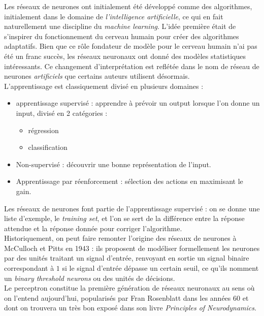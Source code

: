 \documentclass{article}
\theoremstyle{definition}
\begin{document}
Les réseaux de neurones ont initialement été développé comme des algorithmes, initialement dans le domaine de \textit{l'intelligence artificielle}, ce qui en fait naturellement une discipline du \textit{machine learning}. L'idée première était de s'inspirer du fonctionnement du cerveau humain pour créer des algorithmes adaptatifs. Bien que ce rôle fondateur de modèle pour le cerveau humain n'ai pas été un franc succès, les réseaux neuronaux ont donné des modèles statistiques intéressants. Ce changement d'interprétation est reflétée dans le nom de réseau de neurones \textit{artificiels} que certains auteurs utilisent désormais. \\

L'apprentissage est classiquement divisé en plusieurs domaines :
\begin{itemize}
\item apprentissage supervisé : apprendre à prévoir un output lorsque l'on donne un input, divisé en 2 catégories :
\begin{itemize}
\item régression 
\item classification
\end{itemize}
\item Non-supervisé : découvrir une bonne représentation de l'input.
\item Apprentissage par réenforcement : sélection des actions en maximisant le gain.\\
\end{itemize}
Les réseaux de neurones font partie de l'apprentissage supervisé : on se donne une liste d'exemple, le \textit{training set}, et l'on se sert de la différence entre la réponse attendue et la réponse donnée pour corriger l'algorithme.\\

Historiquement, on peut faire remonter l'origine des réseaux de neurones à McCulloch et Pitts en 1943 : ils proposent de modéliser formellement les neurones par des unités traitant un signal d'entrée, renvoyant en sortie un signal binaire correspondant à $1$ si le signal d'entrée dépasse un certain seuil, ce qu'ils nomment un \textit{binary threshold neurons} ou des unités de décisions.\\

Le perceptron constitue la première génération de réseaux neuronaux au sens où on l'entend aujourd'hui, popularisés par Fran Rosenblatt dans les années 60 et dont on trouvera un très bon exposé dans son livre \textit{Principles of Neurodynamics}.\\
\end{document}
